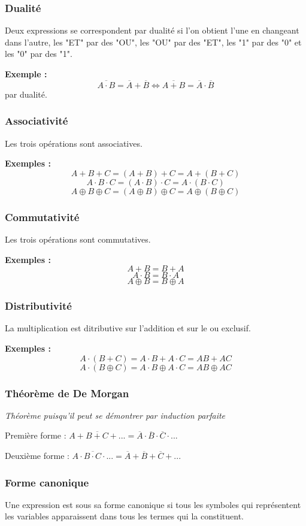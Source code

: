 \documentclass[a4paper,11pt]{book}
\theoremstyle{definition}
\theoremstyle{definition}
\begin{document}
\subsubsection{Dualité}
Deux expressions se correspondent par dualité si l'on obtient l'une en changeant dans l'autre, les "ET" par des "OU", les "OU" par des "ET", les "1" par des "0" et les "0" par des "1".

\textbf{Exemple :}
\[\overline{A\cdot B} = \overline{A} + \overline{B}
\Leftrightarrow \overline{A + B} = \overline{A} \cdot \overline{B}\] par dualité.


\subsubsection{Associativité}
Les trois opérations sont associatives.

\textbf{Exemples :}
\[A + B + C = (A + B) + C = A + (B + C)\]
\[A \cdot B \cdot C = (A \cdot B) \cdot C = A \cdot (B \cdot C)\]
\[A \oplus B \oplus C = (A \oplus B) \oplus C = A \oplus (B \oplus C)\]


\subsubsection{Commutativité}
Les trois opérations sont commutatives.

\textbf{Exemples :}
\[A + B = B + A\]
\[A \cdot B = B \cdot A\]
\[A \oplus B = B \oplus A\]

\subsubsection{Distributivité}
La multiplication est ditributive sur l'addition et sur le ou exclusif.

\textbf{Exemples :}
\[A\cdot (B + C) = A\cdot B + A\cdot C = AB + AC \]
\[A\cdot (B \oplus C) = A\cdot B \oplus A\cdot C = AB \oplus AC \]

\subsubsection{Théorème de De Morgan}
\emph{Théorème puisqu'il peut se démontrer par induction parfaite}

Première forme : $\overline{A+B+C+...} = \overline{A} \cdot \overline{B} \cdot \overline{C} \cdot ...$

Deuxième forme : $\overline{A\cdot B\cdot C\cdot ...} = \overline{A} + \overline{B} + \overline{C} + ...$
\subsubsection{Forme canonique}
Une expression est sous sa forme canonique si tous les symboles qui représentent les variables apparaissent dans tous les termes qui la constituent.
\end{document}
